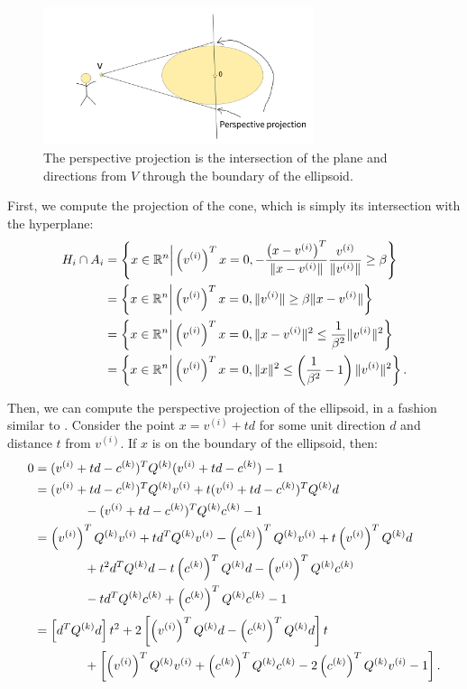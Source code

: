 \begin{figure}[ht]
    \centering
    \includegraphics[width=300px]{images/perspective_projection.png}
    \caption[A depiction of the perspective projection]{
    		The perspective projection is the intersection of the plane and directions from $V$ through the boundary of the ellipsoid.
	}
    \label{perspective_projection_depiction}
\end{figure}

First, we compute the projection of the cone, which is simply its intersection with the hyperplane:
\begin{align*}
H_i \cap A_i 
&= \left\{x \in \mathbb R^n \bigg| \left(v^{(i)}\right)^Tx = 0, -\frac{\left(x - v^{(i)}\right)^T}{\|x - v^{(i)}\|}\frac{v^{(i)}}{\|v^{(i)}\|}\ge \beta \right\} \\
&= \left\{x \in \mathbb R^n \bigg| \left(v^{(i)}\right)^Tx = 0, \|v^{(i)}\|\ge \beta\|x - v^{(i)}\| \right\} \\
&= \left\{x \in \mathbb R^n \bigg| \left(v^{(i)}\right)^Tx = 0, \|x - v^{(i)}\|^2 \le \frac 1 {\beta^2}\|v^{(i)}\|^2 \right\} \\
&= \left\{x \in \mathbb R^n \bigg| \left(v^{(i)}\right)^Tx = 0, \|x\|^2 \le \left(\frac 1 {\beta^2} - 1\right)\|v^{(i)}\|^2 \right\}.
\end{align*}

Then, we can compute the perspective projection of the ellipsoid,  in a fashion similar to \cite{eberly_2013}.
Consider the point $x = v^{(i)} + td$ for some unit direction $d$ and distance $t$ from $v^{(i)}$.
If $x$ is on the boundary of the ellipsoid, then:
\begin{align*}
0 &= (v^{(i)} + t d - c^{(k)} )^T {Q^{(k)}}  (v^{(i)} + t d - c^{(k)} ) - 1\\
&= (v^{(i)} + t d - c^{(k)} )^T {Q^{(k)}}  v^{(i)} + t (v^{(i)} + t d - c^{(k)} )^T {Q^{(k)}} d \\ 
&\quad \quad \quad \quad- (v^{(i)} + t d - c^{(k)} )^T {Q^{(k)}} c^{(k)} - 1\\
&= \left(v^{(i)}\right)^T {Q^{(k)}}  v^{(i)} + t d^T {Q^{(k)}}  v^{(i)} - \left(c^{(k)}\right) ^T {Q^{(k)}}  v^{(i)} + t \left(v^{(i)}\right)^T {Q^{(k)}}  d \\
&\quad \quad \quad \quad + t^2 d^T {Q^{(k)}}  d - t \left(c^{(k)}\right)^T {Q^{(k)}}  d - \left(v^{(i)}\right)^T {Q^{(k)}}  c^{(k)}  \\
&\quad \quad \quad \quad - t d^T {Q^{(k)}}  c^{(k)} + \left(c^{(k)}\right) ^T {Q^{(k)}} c^{(k)} - 1\\
&= \left[d^T{Q^{(k)}} d
\right] t^2 + 2\left[
\left(v^{(i)}\right)^T {Q^{(k)}}  d - \left(c^{(k)}\right) ^T{Q^{(k)}} d
\right] t \\
&\quad \quad \quad \quad + \left[
\left(v^{(i)}\right)^T {Q^{(k)}}  v^{(i)} + \left(c^{(k)}\right) ^T {Q^{(k)}}  c^{(k)}  - 2 \left(c^{(k)}\right) ^T {Q^{(k)}}  v^{(i)} - 1
\right].
\end{align*}

